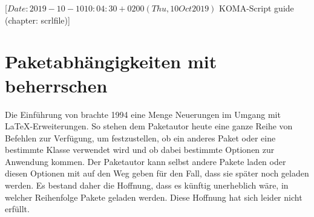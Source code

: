 %
%
%
%
%
%
%
%
% 
%
%
%
%

%
                 [$Date: 2019-10-10 10:04:30 +0200 (Thu, 10 Oct 2019) $
                  KOMA-Script guide (chapter: scrlfile)]

\chapter{Paketabhängigkeiten mit  
  beherrschen}

\BeginIndexGroup
{}

Die Einführung von \LaTeXe{} brachte 1994 eine Menge Neuerungen im Umgang mit
\LaTeX-Erweiterungen. So stehen dem Paketautor heute eine ganze Reihe von
Befehlen zur Verfügung, um festzustellen, ob ein anderes Paket oder eine
bestimmte Klasse verwendet wird und ob dabei bestimmte Optionen zur Anwendung
kommen. Der Paketautor kann selbst andere Pakete laden oder diesen Optionen
mit auf den Weg geben für den Fall, dass sie später noch geladen werden. Es
bestand daher die Hoffnung, dass es künftig unerheblich wäre, in welcher
Reihenfolge Pakete geladen werden. Diese Hoffnung hat sich leider nicht
erfüllt.

